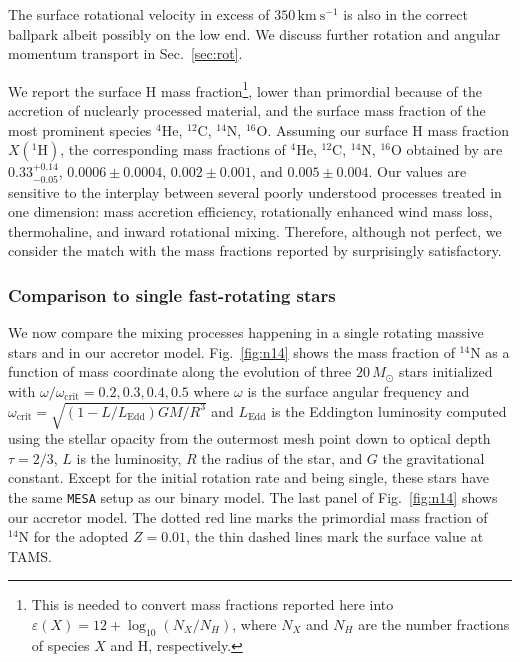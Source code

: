 \documentclass[twocolumn,twocolappendix,trackchanges]{aastex63}
\newcommand{\kms}{{\mathrm{km\ s^{-1}}}}
\DeclareRobustCommand{\Figref}[1]{Fig.~\ref{#1}}
\DeclareRobustCommand{\Secref}[1]{Sec.~\ref{#1}}
\begin{document}
The surface rotational velocity in
excess of $350\,\kms$ is also in the correct ballpark albeit possibly
on the low end. We discuss further rotation and angular momentum
transport in \Secref{sec:rot}.

We report the surface H mass
fraction\footnote{This is needed to convert mass fractions reported
  here into $\varepsilon(X)=12+\log_{10}(N_X/N_H)$, where $N_X$ and
  $N_H$ are the number fractions of species $X$ and H, respectively.},
lower than primordial because of the accretion of nuclearly processed
material, and the surface mass fraction of the most prominent species
$^4\mathrm{He}$, $^{12}\mathrm{C}$, $^{14}\mathrm{N}$,
$^{16}\mathrm{O}$.  Assuming our surface H mass fraction
$X(^1\mathrm{H})$, the corresponding mass fractions of $^4\mathrm{He}$,
$^{12}\mathrm{C}$, $^{14}\mathrm{N}$, $^{16}\mathrm{O}$ obtained by
 are
$0.33^{+0.14}_{-0.05}$,
$0.0006\pm0.0004$,
$0.002\pm0.001$, and
$0.005\pm0.004$.  Our values are
sensitive to the interplay between several poorly understood
processes treated in one dimension: mass accretion efficiency, rotationally enhanced wind mass
loss, thermohaline, and inward rotational mixing. Therefore, although
not perfect, we consider the match with the mass fractions reported by
 surprisingly satisfactory.

\subsubsection{Comparison to single fast-rotating stars}
\label{sec:mix_comparison_single}

We now compare the mixing processes
happening in a single rotating massive stars and in our accretor
model. \Figref{fig:n14} shows the mass fraction of $^{14}\mathrm{N}$
as a function of mass coordinate along the evolution of three
$20\,M_\odot$ stars initialized with
$\omega/\omega_\mathrm{crit}=0.2,0.3,0.4,0.5$ where $\omega$ is the
surface angular frequency and
$\omega_\mathrm{crit}=\sqrt{(1-L/L_\mathrm{Edd})GM/R^3}$ and
$L_\mathrm{Edd}$ is the Eddington luminosity computed using the
stellar opacity from the outermost mesh point down to optical depth
$\tau=2/3$, $L$ is the luminosity, $R$ the radius of the star, and $G$
the gravitational constant. Except for the initial rotation rate and
being single, these stars have the same \texttt{MESA}
setup as our binary model. The last panel of \Figref{fig:n14} shows
our accretor model. The dotted red line marks the primordial mass
fraction of $^{14}\mathrm{N}$ for the adopted $Z=0.01$, the thin
dashed lines mark the surface value at TAMS.
\end{document}
